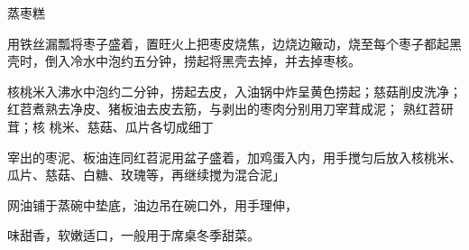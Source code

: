 \begin{recipe}{蒸枣糕}

\ingredients


\cooking

\step 用铁丝漏瓢将枣子盛着，置旺火上把枣皮烧焦，边烧边簸动，烧至每个枣子都起黑
壳时，倒入冷水中泡约五分钟，捞起将黑壳去掉，并去掉枣核。

\step 核桃米入沸水中泡约二分钟，捞起去皮，入油锅中炸呈黄色捞起；慈菇削皮洗净；
红苕煮熟去净皮、猪板油去皮去筋，与剥出的枣肉分别用刀宰茸成泥； 熟红苕研茸；核
桃米、慈菇、瓜片各切成细丁

\step 宰出的枣泥、板油连同红苕泥用盆子盛着，加鸡蛋入内，用手搅匀后放入核桃米、
瓜片、慈菇、白糖、玫瑰等，再继续搅为混合泥」

\step 网油铺于蒸碗中垫底，油边吊在碗口外，用手理伸，

\notes

味甜香，软嫩适口，一般用于席桌冬季甜菜。

\end{recipe}

